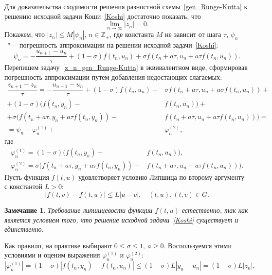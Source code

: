 \documentclass[11pt,a4paper,twoside]{report}
\numberwithin{equation}{section}
\theoremstyle{definition}
\theoremstyle{plain}
\newtheorem*{note*}{Замечание}
\begin{document}
%
Для доказательства сходимости решения разностной схемы~\eqref{gen_Runge-Kutta}
к решению исходной задачи Коши~\eqref{Koshi} достаточно показать,
что
%
$$
    \lim\limits_{n\rightarrow\infty}|z_n| = 0.
$$
%
Покажем, что $|z_n| \leqslant M |\psi_n|$, $n\in\mathbb{Z}_+$, где константа $M$ не зависит от шага $\tau$,
$\psi_n$~"--- погрешность аппроксимации на решении исходной задачи~\eqref{Koshi}:
%
$$
    \psi_n = -\dfrac{u_{n+1} - u_n}{\tau} + (1 - \sigma)f(t_n, u_n) +
        \sigma f(t_n + a\tau, u_n + a\tau f(t_n, u_n)).
$$
%
Перепишем задачу~\eqref{z_n_gen_Runge-Kutta} в эквивалентном виде,
сформировав погрешность аппроксимации путем добавления недостающих слагаемых:
%
\begin{equation*}
%
    \begin{split}
        \dfrac{z_{n+1} - z_n}{\tau} = -\dfrac{u_{n+1} - u_n}{\tau} +
        (1-\sigma)f(t_n, u_n) +&
        \sigma f(t_n + a\tau, u_n + a\sigma f(t_n,u_n)) + \\
        + (1-\sigma)(f(t_n, y_n) -& f(t_n, u_n)) + \\
        + \sigma \big(f(t_n + a\tau, y_n + a \tau f(t_n, y_n)) -&
        f(t_n + a\tau, u_n + a\tau f(t_n, u_n))\big) = \\
        = \psi_n + \varphi_n^{(1)} +& \varphi_n^{(2)},
    \end{split}
%
\end{equation*}
%
где
%
\begin{equation*}
%
    \begin{split}
        \varphi_n^{(1)} =  (1-\sigma)(f(t_n, y_n) -& f(t_n, u_n)), \\
        \varphi_n^{(2)} =  \sigma \big(f(t_n + a\tau, y_n + a \tau f(t_n, y_n)) -&
        f(t_n + a\tau, u_n + a\tau f(t_n, u_n))\big).
    \end{split}
%
\end{equation*}
%
Пусть функция $f(t, u)$ удовлетворяет условию Липшица по второму аргументу
с константой $L>0$:
%
$$
    |f(t,v) - f(t,u)| \leqslant L|u-v|, \quad (t, u), (t, v)\in G.
$$
%
\begin{note*}
%
    Требование липшицевости функции $f(t, u)$ естественно, так
    как является условием
    того, что решение исходной задачи~\eqref{Koshi} существует и единственно.
%
\end{note*}
%
Как правило, на практике выбирают $0\leqslant\sigma\leqslant1, ~a\geqslant0$.
Воспользуемся этими условиями и оценим выражения $\varphi_n^{(1)}$ и $\varphi_n^{(2)}$:
%
$$
    |\varphi_n^{(1)}| = (1 - \sigma)|f(t_n, y_n) - f(t_n, u_n)| \leqslant
    (1 - \sigma)L|y_n - u_n| = (1 - \sigma)L|z_n|,
$$
\end{document}
